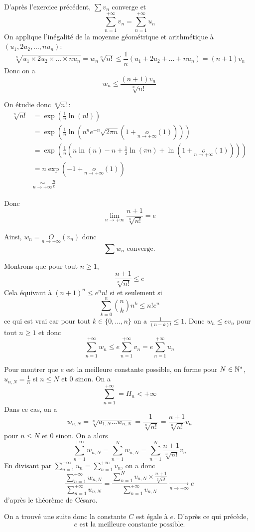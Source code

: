 \begin{solution}
	D'après l'exercice précédent, $\sum v_{n}$ converge et 
	$$\sum_{n=1}^{+\infty}v_{n}=\sum_{n=1}^{+\infty}u_{n}$$
	On applique l'inégalité de la moyenne géométrique et arithmétique à $(u_{1},2u_{2},\dots,nu_{n})$:
	$$\sqrt[n]{u_{1}\times 2u_{2}\times\dots\times nu_{n}}=w_{n}\sqrt[n]{n!}\leqslant\frac{1}{n}(u_{1}+2u_{2}+\dots+nu_{n})=(n+1)v_{n}$$
	Donc on a 
	$$w_{n}\leqslant\frac{(n+1)v_{n}}{\sqrt[n]{n!}}$$

	On étudie donc $\sqrt[n]{n!}$:
	\begin{align*}
		\sqrt[n]{n!}
		&=\exp\left(\frac{1}{n}\ln(n!)\right)\\
		&=\exp\left(\frac{1}{n}\ln\left(n^{n}e^{-n}\sqrt{2\pi n}\left(1+\underset{n\to+\infty}{o}\left(1\right)\right)\right)\right)\\
		&=\exp\left(\frac{1}{n}\left(n\ln\left(n\right)-n+\frac{1}{2}\ln\left(\pi n\right)+\ln\left(1+\underset{n\to+\infty}{o}\left(1\right)\right)\right)\right)\\
		&=n\exp\left(-1+\underset{n\to+\infty}{o}\left(1\right)\right)\\
		&\underset{n\to+\infty}{\sim}\frac{n}{e}
	\end{align*}

	Donc $$\lim\limits_{n\to+\infty}\frac{n+1}{\sqrt[n]{n!}}=e$$

	Ainsi, $w_{n}=\underset{n\to+\infty}{O}(v_{n})$ donc 
	$$\boxed{\sum w_{n}\text{ converge.}}$$

	Montrons que pour tout $n\geqslant1$, 
	$$\frac{n+1}{\sqrt[n]{n!}}\leqslant e$$
	Cela équivaut à $(n+1)^{n}\leqslant e^{n}n!$ si et seulement si 
	$$\sum_{k=0}^{n}\binom{n}{k}n^{k}\leqslant n!e^{n}$$
	ce qui est vrai car pour tout $k\in\{0,\dots,n\}$ on a $\frac{1}{(n-k)!}\leqslant1$.
	Donc $w_{n}\leqslant ev_{n}$ pour tout $n\geqslant1$ et donc 
	$$\boxed{\sum_{n=1}^{+\infty}w_{n}\leqslant e\sum_{n=1}^{+\infty}v_{n}=e\sum_{n=1}^{+\infty}u_{n}}$$

	Pour montrer que $e$ est la meilleure constante possible, on forme pour $N\in\mathbb{N}^{*}$, $u_{n,N}=\frac{1}{n}$ si $n\leqslant N$ et 0 sinon.
	On a 
	$$\sum_{n=1}^{+\infty}=H_{n}<+\infty$$
	Dans ce cas, on a 
	$$w_{n,N}=\sqrt[n]{u_{1,N}\dots w_{n,N}}=\frac{1}{\sqrt[n]{n!}}=\frac{n+1}{\sqrt[n]{n!}}v_{n}$$
	pour $n\leqslant N$ et 0 sinon.
	On a alors 
	$$\sum_{n=1}^{+\infty}w_{n,N}=\sum_{n=1}^{N}w_{n,N}=\sum_{n=1}^{N}\frac{n+1}{\sqrt[n]{n!}}v_{n}$$
	En divisant par $\sum_{n=1}^{+\infty}u_{n}=\sum_{n=1}^{+\infty}v_{n}$, on a donc 
	$$\frac{\sum_{n=1}^{+\infty}w_{n,N}}{\sum_{n=1}^{+\infty}u_{n,N}}=\frac{\sum_{n=1}^{N}v_{n,N}\times\frac{n+1}{\sqrt[n]{n!}}}{\sum_{n=1}^{+\infty}v_{n,N}}\xrightarrow[n\to+\infty]{}e$$
	d'après le théorème de Césaro.

	On a trouvé une suite donc la constante $C$ est égale à $e$. D'après ce qui précède, 
	$$\boxed{e\text{ est la meilleure constante possible.}}$$
\end{solution}

